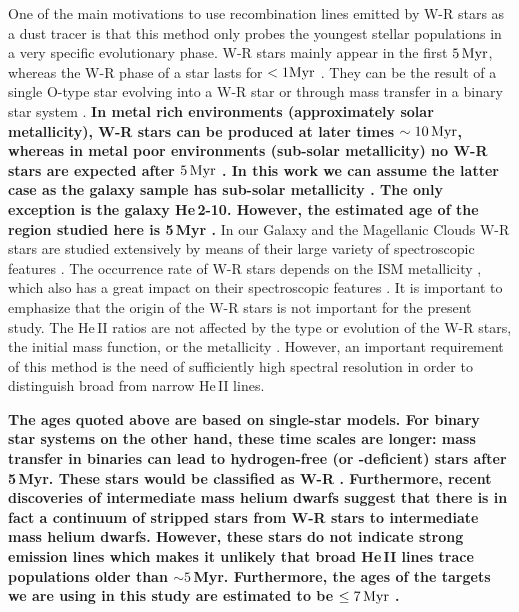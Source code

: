 \documentclass[linenumbers]{aastex63}
\begin{document}
One of the main motivations to use recombination lines emitted by W-R stars as a dust tracer is that this method only probes the youngest stellar populations in a very specific evolutionary phase.
W-R stars mainly appear in the first ${\rm 5\,Myr}$, whereas the W-R phase of a star lasts for $< 1 {\rm Myr}$ \citep{meynet_stellar_2005}.
They can be the result of a single O-type star evolving into a W-R star \citep{meynet_massive_2017} or through mass transfer in a binary star system \citep{eldridge_binary_2017}. 
\textbf{In metal rich environments (approximately solar metallicity), W-R stars can be produced at later times $\sim {\rm 10\,Myr}$, whereas in metal poor environments (sub-solar metallicity) no W-R stars are expected after ${\rm 5\,Myr}$ \citep[see Figure\,14 in ][]{leitherer_effects_2014}. In this work we can assume the latter case as the galaxy sample has sub-solar metallicity \citep[see Table\,1 in][]{chandar_ngc_2004}. The only exception is the galaxy He\,2-10. However, the estimated age of the region studied here is 5\,Myr \citep[see Table\,2 in][]{chandar_ngc_2004}.}
In our Galaxy and the Magellanic Clouds W-R stars are studied extensively by means of their large variety of spectroscopic features \citep{crowther_physical_2007}. 
The occurrence rate of W-R stars depends on the ISM metallicity \citep{conti_evolution_1983, van_der_hucht_viith_2001}, which also has a great impact on their spectroscopic features \citep{mokiem_empirical_2007}.
It is important to emphasize that the origin of the W-R stars is not important for the present study. The He\,II ratios are not affected by the type or evolution of the W-R stars, the initial mass function, or the metallicity \citep{leitherer_he_2019}. 
However, an important requirement of this method is the need of sufficiently high spectral resolution in order to distinguish broad from narrow He\,II lines. 

\textbf{The ages quoted above are based on single-star models. For binary star systems on the other hand, these time scales are longer: 
mass transfer in binaries can lead to hydrogen-free (or -deficient) stars after 5\,Myr. These stars would be classified as W-R \citep{xiao_emission-line_2018}. 
Furthermore, recent discoveries of intermediate mass helium dwarfs \citep{drout_discovery_2023,gotberg_stellar_2023} suggest that there is in fact a continuum of stripped stars from W-R stars to intermediate mass helium dwarfs. However, these stars do not indicate strong emission lines which makes it unlikely that broad He\,II lines trace populations older than $\sim5\,$Myr. Furthermore, the ages of the targets we are using in this study are estimated to be $\leq {\rm 7\,Myr}$ \citep[][their Table\,2]{chandar_ngc_2004}.}
\end{document}

